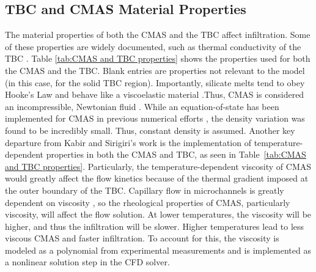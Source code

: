 \documentclass[%
 aip,
 amsmath,amssymb,
 reprint,%
floatfix]{revtex4-1}
\begin{document}
\subsection{TBC and CMAS Material Properties}
\label{subsec:CMAS/TBCProp}
The material properties of both the CMAS and the TBC affect infiltration. Some of these properties are widely documented, such as thermal conductivity of the TBC \cite{Han2023}. Table \ref{tab:CMAS and TBC properties} shows the properties used for both the CMAS and the TBC. Blank entries are properties not relevant to the model (in this case, for the solid TBC region). Importantly, silicate melts tend to obey Hooke's Law and behave like a viscoelastic material \cite{Sharon1997}.Thus, CMAS is considered an incompressible, Newtonian fluid \cite{Naraparaju2017,Naraparaju2019, Sharon1997}.  While an equation-of-state has been implemented for CMAS in previous numerical efforts \cite{Sirigiri2018}, the density variation was found to be incredibly small. Thus, constant density is assumed. 
Another key departure from Kabir and Sirigiri's work \cite{Kabir, Sirigiri2018} is the implementation of temperature-dependent properties in both the CMAS and TBC, as seen in Table~\ref{tab:CMAS and TBC properties}. Particularly, the temperature-dependent viscosity of CMAS would greatly affect the flow kinetics because of the thermal gradient imposed at the outer boundary of the TBC. Capillary flow in microchannels is greatly dependent on viscosity \cite{Washburn19213}, so the rheological properties of CMAS, particularly viscosity, will affect the flow solution. At lower temperatures, the viscosity will be higher, and thus the infiltration will be slower. Higher temperatures lead to less viscous CMAS and faster infiltration. To account for this, the viscosity is modeled as a polynomial from experimental measurements \cite{Naraparaju2019} and is implemented as a nonlinear solution step in the CFD solver.
\end{document}
